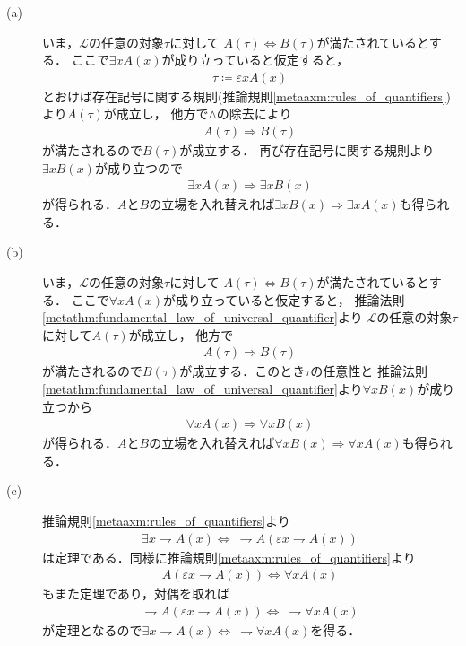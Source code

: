 	\begin{prf}\mbox{}
		\begin{description}
			\item[(a)]
				いま，$\mathcal{L}$の任意の対象$\tau$に対して
				$A(\tau) \Longleftrightarrow B(\tau)$が満たされているとする．
				ここで$\exists x A(x)$が成り立っていると仮定すると，
				\begin{align}
					\tau \coloneqq \varepsilon x A(x)
				\end{align}
				とおけば存在記号に関する規則(推論規則\ref{metaaxm:rules_of_quantifiers})より$A(\tau)$が成立し，
				他方で$\wedge$の除去により
				\begin{align}
					A(\tau) \Longrightarrow B(\tau)
				\end{align}
				が満たされるので$B(\tau)$が成立する．
				再び存在記号に関する規則より$\exists x B(x)$が成り立つので
				\begin{align}
					\exists x A(x) \Longrightarrow \exists x B(x)
				\end{align}
				が得られる．$A$と$B$の立場を入れ替えれば$\exists x B(x) \Longrightarrow \exists x A(x)$も得られる．
				
			\item[(b)]
				いま，$\mathcal{L}$の任意の対象$\tau$に対して
				$A(\tau) \Longleftrightarrow B(\tau)$が満たされているとする．
				ここで$\forall x A(x)$が成り立っていると仮定すると，
				推論法則\ref{metathm:fundamental_law_of_universal_quantifier}より
				$\mathcal{L}$の任意の対象$\tau$に対して$A(\tau)$が成立し，
				他方で
				\begin{align}
					A(\tau) \Longrightarrow B(\tau)
				\end{align}
				が満たされるので$B(\tau)$が成立する．このとき$\tau$の任意性と
				推論法則\ref{metathm:fundamental_law_of_universal_quantifier}より$\forall x B(x)$が成り立つから
				\begin{align}
					\forall x A(x) \Longrightarrow \forall x B(x)
				\end{align}
				が得られる．$A$と$B$の立場を入れ替えれば$\forall x B(x) \Longrightarrow \forall x A(x)$も得られる．
				
			\item[(c)]
				推論規則\ref{metaaxm:rules_of_quantifiers}より
				\begin{align}
					\exists x \rightharpoondown A(x) \Longleftrightarrow\ 
					\rightharpoondown A(\varepsilon x \rightharpoondown A(x))
				\end{align}
				は定理である．同様に推論規則\ref{metaaxm:rules_of_quantifiers}より
				\begin{align}
					A(\varepsilon x \rightharpoondown A(x)) \Longleftrightarrow \forall x A(x) 
				\end{align}
				もまた定理であり，対偶を取れば
				\begin{align}
					\rightharpoondown A(\varepsilon x \rightharpoondown A(x)) \Longleftrightarrow\ 
					\rightharpoondown \forall x A(x)
				\end{align}
				が定理となるので$\exists x \rightharpoondown A(x) \Longleftrightarrow\ \rightharpoondown \forall x A(x)$を得る．
			

\end{description}
\end{prf}
